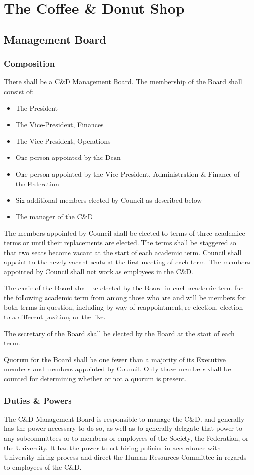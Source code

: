 \section{The Coffee \& Donut Shop}
\subsection{Management Board}
\subsubsection{Composition}
There shall be a C\&D Management Board. The membership of the Board shall
consist of:
\begin{itemize}
\item The President
\item The Vice-President, Finances
\item The Vice-President, Operations
\item One person appointed by the Dean
\item One person appointed by the Vice-President, Administration \& Finance of
the Federation
\item Six additional members elected by Council as described below
\item The manager of the C\&D
\end{itemize}
The members appointed by Council shall be elected to terms of three academice
terms or until their replacements are elected. The terms shall be staggered so
that two seats become vacant at the start of each academic term. Council shall
appoint to the newly-vacant seats at the first meeting of each term. The members
appointed by Council shall not work as employees in the C\&D.

The chair of the Board shall be elected by the Board in each academic term for
the following academic term from among those who are and will be members for both
terms in question, including by way of reappointment, re-election, election to a
different position, or the like.

The secretary of the Board shall be elected by the Board at the start of each
term.

Quorum for the Board shall be one fewer than a majority of its Executive members
and members appointed by Council. Only those members shall be counted for
determining whether or not a quorum is present.

\subsubsection{Duties \& Powers}
The C\&D Management Board is responsible to manage the C\&D, and generally has
the power necessary to do so, as well as to generally delegate that power to any
subcommittees or to members or employees of the Society, the Federation, or the
University. It has the power to set hiring policies in accordance with
University hiring process and direct the Human Resources Committee in regards to
employees of the C\&D.

